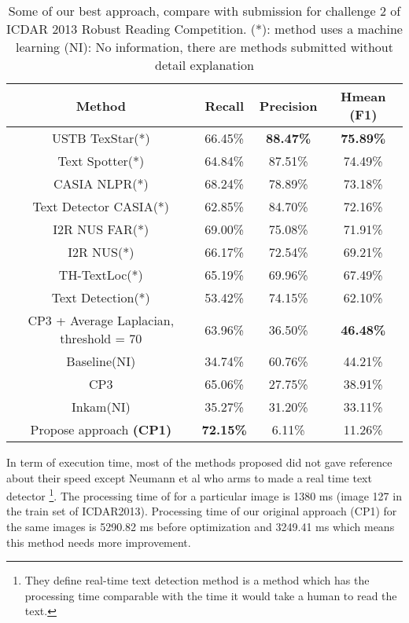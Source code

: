 \begin {table}[H]
\caption{Some of our best approach, compare with submission for challenge 2 of ICDAR 2013 Robust Reading Competition. (*): method uses a machine learning (NI): No information, there are methods submitted without detail explanation}\label{tab:Comparation} 
\begin{tabular}{|c|c|c|c|}
\hline 
\textbf{Method} & \textbf{Recall} & \textbf{Precision} & \textbf{Hmean (F1)} \\ 
\hline 
USTB TexStar(*) & 66.45\% & \textbf{88.47\%} & \textbf{75.89\%} \\ 
\hline 
Text Spotter(*) & 64.84\% & 87.51\% & 74.49\% \\ 
\hline 
CASIA NLPR(*)  & 68.24\% & 78.89\% & 73.18\% \\ 
\hline 
Text Detector CASIA(*) & 62.85\% & 84.70\% & 72.16\% \\ 
\hline 
I2R NUS FAR(*) & 69.00\% & 75.08\% & 71.91\% \\ 
\hline 
I2R NUS(*) & 66.17\% & 72.54\% & 69.21\% \\ 
\hline 
TH-TextLoc(*) & 65.19\% & 69.96\% & 67.49\% \\ 
\hline 
Text Detection(*) & 53.42\% & 74.15\% & 62.10\% \\ 
\hline 
CP3 + Average Laplacian, threshold = 70 & 63.96\% & 36.50\% & \textbf{46.48\%} \\ 
\hline 
Baseline(NI) & 34.74\% & 60.76\% & 44.21\%\\ 
\hline 
CP3 & 65.06\% & 27.75\% & 38.91\% \\ 
\hline 
Inkam(NI) & 35.27\% & 31.20\% & 33.11\% \\ 
\hline 
Propose approach \textbf{(CP1)} &\textbf{ \textbf{72.15\%}} & 6.11\% & 11.26\% \\
\hline 
\end{tabular} 
\end{table}

In term of execution time, most of the methods proposed did not gave reference about their speed except Neumann et al \cite{Neumann12} who arms to made a real time text detector \footnote{They define real-time text detection method is a method which has the processing time comparable with the time it would take a human to read the text.}. The processing time of \cite{Neumann12} for a particular image is 1380 ms (image 127 in the train set of ICDAR2013). Processing time of our original approach (CP1) for the same images is 5290.82 ms before optimization and 3249.41 ms which means this method needs more improvement.







